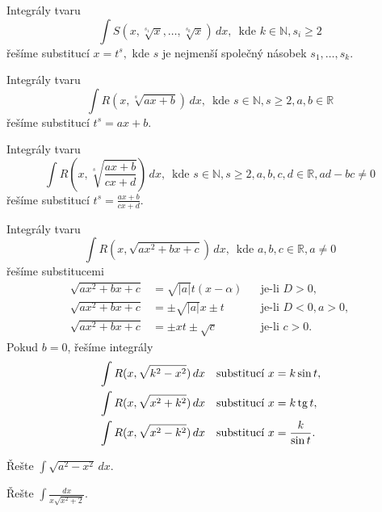 \begin{veta}
    Integrály tvaru
    $$\int S(x, \sqrt[s_1]{x}, \dots, \sqrt[s_k]{x}  ) \, dx ,\,\,\, \textrm{kde } k \in \mathbb N, s_i \geq 2$$
    řešíme substitucí $x=t^s,$ kde $s$ je nejmenší společný násobek $s_1,\dots, s_k.$
\end{veta}

\begin{veta}
    Integrály tvaru
    $$\int R(x, \sqrt[s]{ax+b} )\, dx, \,\,\, \textrm{kde } s \in \mathbb N, s \geq 2, a,b \in \mathbb R$$
    řešíme substitucí $t^s=ax+b$.
\end{veta}

\begin{veta}
    Integrály tvaru
    $$\int R\left (x, \sqrt[s]{\frac{ax+b}{cx+d}} \right)\, dx, \,\,\, \textrm{kde } s \in \mathbb N, s \geq 2, a,b,c,d \in \mathbb R, ad-bc \ne 0$$
    řešíme substitucí $t^s=\frac{ax+b}{cx+d}.$
\end{veta}

\begin{veta}
    Integrály tvaru
    $$\int R(x,\sqrt{ax^2+bx+c}) \, dx, \,\,\, \textrm{kde } a,b,c\in \mathbb R, a \ne 0$$
    řešíme substitucemi
    \begin{align*}
    \sqrt{ax^2+bx+c} &= \sqrt{|a|}t(x-\alpha) & & \textrm{je-li }D >0,  \\
    \sqrt{ax^2+bx+c} &= \pm\sqrt{|a|}x\pm t & & \textrm{je-li }D <0, a>0, \\
    \sqrt{ax^2+bx+c} &= \pm xt \pm \sqrt{c}  & & \textrm{je-li }c >0.
    \end{align*}
    Pokud $b=0$, řešíme integrály
    \begin{align*}
        &\int R(x, \sqrt{k^2-x^2} )\, dx & & \textrm{substitucí } x=k\sin t, \\
        &\int R(x, \sqrt{x^2+k^2})\, dx & & \textrm{substitucí } x=k\operatorname{tg} t, \\
        &\int R(x, \sqrt{x^2-k^2} )\, dx & & \textrm{substitucí } x=\frac{k}{\sin t}.
    \end{align*}
\end{veta}

\begin{priklad}
Řešte $\int \sqrt{a^2-x^2}\, dx. $
\end{priklad}

\begin{priklad}
Řešte $\int \frac{dx}{x \sqrt{x^2+2} }.$
\end{priklad}

